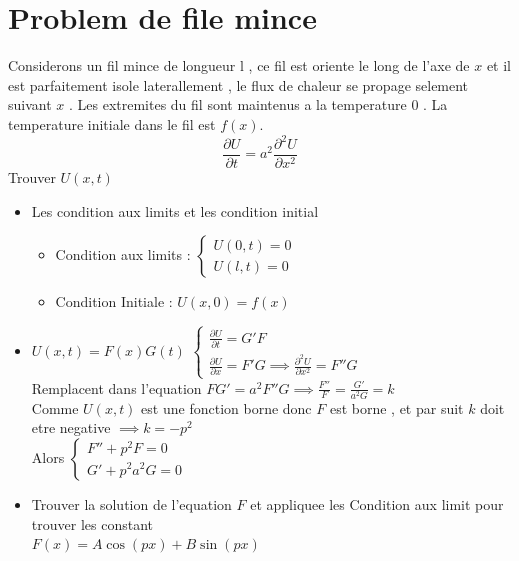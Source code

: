\documentclass[12pt]{book}
\begin{document}
        \section{Problem de file mince}
            Considerons un fil mince de longueur l , ce fil est oriente le long de l'axe de $x$ et il est parfaitement isole laterallement , le flux de chaleur se propage selement suivant $x$ . 
            Les extremites du fil sont maintenus a la temperature  $0$ . La temperature initiale dans le fil est $f(x)$. \\
            \[ \frac{\partial U}{\partial t} = a^2\frac{\partial^2U}{\partial x^2} \]
            Trouver $U(x,t)$
            \begin{itemize}
                \item Les condition aux limits et les condition initial \\
                    \begin{itemize}
                        \item Condition aux limits : $\begin{cases} U(0,t)=0 \\ U(l,t) =0\end{cases}$
                        \item Condition Initiale : $U(x,0)=f(x)$
                    \end{itemize}
                \item $U(x,t) = F(x)G(t)$ $\begin{cases}\frac{\partial U}{\partial t} = G'F \\  \frac{\partial U}{\partial x} = F'G\implies \frac{\partial^2U}{\partial x^2} = F''G \end{cases}$ \\
                    Remplacent dans l'equation $FG'=a^2F''G \implies \frac{F''}{F}=\frac{G'}{a^2G} = k$ \\
                    Comme $U(x,t)$ est une fonction borne donc $F$ est borne , et par suit $k$ doit etre negative $\implies k = -p^2$ \\
                    Alors $\begin{cases} F''+p^2F = 0\\ G'+p^2a^2G = 0\end{cases}$
                \item Trouver la solution de l'equation $F$ et appliquee les Condition aux limit pour trouver les constant \\
                    $F(x) = A\cos(px)+B\sin(px)$\\

\end{itemize}
\end{document}
